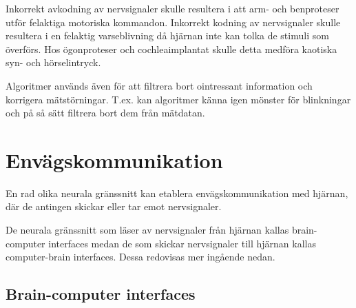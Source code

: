\documentclass[12pt, a4paper]{article}
\begin{document}
Inkorrekt avkodning av nervsignaler skulle resultera i att arm- och benproteser
utför felaktiga motoriska kommandon. Inkorrekt kodning av nervsignaler skulle
resultera i en felaktig varseblivning då hjärnan inte kan tolka de stimuli som
överförs. Hos ögonproteser och cochleaimplantat skulle detta medföra kaotiska
syn- och hörselintryck.




Algoritmer används även för att filtrera bort ointressant information och
korrigera mätstörningar. T.ex. kan algoritmer känna igen mönster för blinkningar
och på så sätt filtrera bort dem från mätdatan.


\section{Envägskommunikation}

En rad olika neurala gränssnitt kan etablera envägskommunikation med hjärnan,
där de antingen skickar eller tar emot nervsignaler.

De neurala gränssnitt som läser av nervsignaler från hjärnan kallas
brain-computer interfaces medan de som skickar nervsignaler till hjärnan kallas
computer-brain interfaces. Dessa redovisas mer ingående nedan.



\subsection{Brain-computer interfaces}
\end{document}
